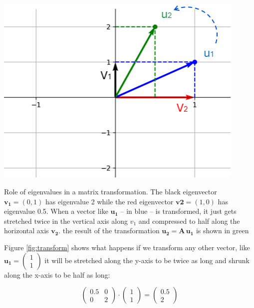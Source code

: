 \documentclass{tufte-book} %
\begin{document}
\begin{marginfigure}
	\begin{center}
		\includegraphics[width=0.9\textwidth]{transform}	
	\end{center}
	\caption{Role of eigenvalues in a matrix transformation. The black eigenvector $\mathbf{v_1} = (0,1)$ has eigenvalue 2 while the red eigenvector $\mathbf{v2}=(1,0)$ has eigenvalue 0.5. When a vector like $\mathbf{u_1}$ -- in blue -- is transformed, it just gets stretched twice in the vertical axis along $v_1$ and compressed to half along the horizontal axis $\mathbf{v_2}$. the result of the transformation $\mathbf{u_2} = \mathbf{A} \, \mathbf{u_1}$ is shown in green}
	\label{fig:transform}
\end{marginfigure}

Figure \ref{fig:transform} shows what happens if we transform any other vector, like $\mathbf{u_1}=\begin{pmatrix}  1\\ 1 \end{pmatrix}$ it will be stretched along the y-axis to be twice as long and shrunk along the x-axis to be half as long:

\begin{equation}
	\begin{pmatrix} 0.5 & 0\\ 0 &  2 \end{pmatrix} \cdot \begin{pmatrix}  1\\ 1 \end{pmatrix} = \begin{pmatrix}  0.5\\ 2 \end{pmatrix}
\end{equation}
\end{document}
